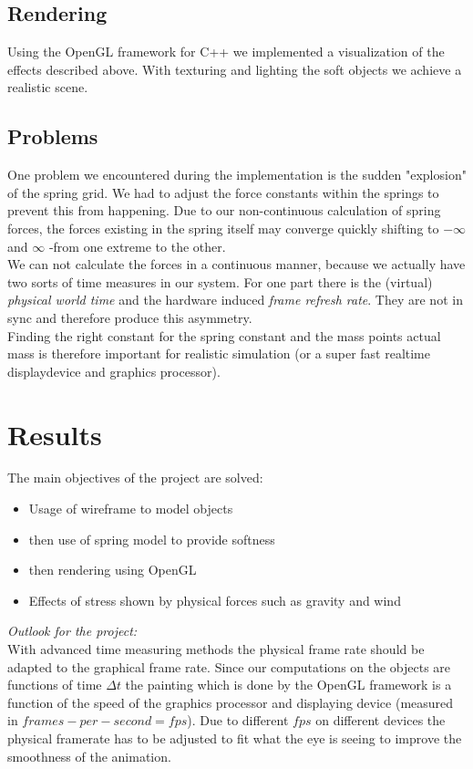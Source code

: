 \documentclass[11pt]{article}
\begin{document}
\subsection{Rendering}
Using the OpenGL framework for C++ we implemented a visualization of the effects described above. With texturing and lighting the soft objects we achieve a realistic scene.
\subsection{Problems}
One problem we encountered during the implementation is the sudden "explosion" of the spring grid. We had to adjust the force constants within the springs to prevent this from happening. Due to our non-continuous calculation of spring forces, the forces existing in the spring itself may converge quickly shifting to $-\infty$ and $\infty$ -from one extreme to the other.\\[1em]
We can not calculate the forces in a continuous manner, because we actually have two sorts of time measures in our system. For one part there is the (virtual) \textit{physical world time} and the hardware induced \textit{frame refresh rate}. They are not in sync and therefore produce this asymmetry.\\[1em]
Finding the right constant for the spring constant and the mass points actual mass is therefore important for realistic simulation (or a super fast realtime displaydevice and graphics processor).
%
\section{Results}
The main objectives of the project are solved:
\begin{itemize}
\item{Usage of wireframe to model objects}
\item{then use of spring model to provide softness}
\item{then rendering using OpenGL}
\item{Effects of stress shown by physical forces such as gravity and wind}
\end{itemize}

\textit{Outlook for the project:}\\
With advanced time measuring methods the physical frame rate should be adapted to the graphical frame rate. Since our computations on the objects are functions of time $\Delta t$ the painting which is done by the OpenGL framework is a function of the speed of the graphics processor and displaying device (measured in $frames-per-second=fps$). Due to different $fps$ on different devices the physical framerate has to be adjusted to fit what the eye is seeing to improve the smoothness of the animation.\\[1em]
%
\end{document}
